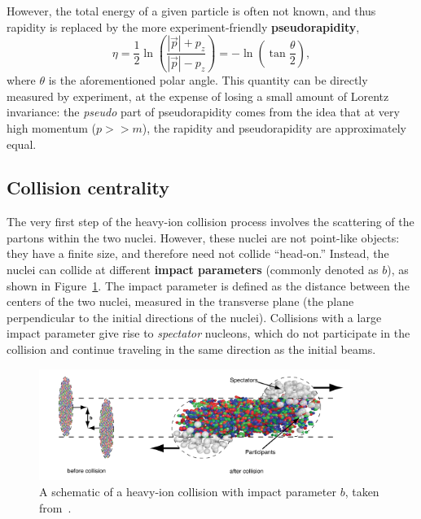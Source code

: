However, the total energy of a given particle is often not known, and thus rapidity is replaced by the more experiment-friendly \textbf{pseudorapidity}, 
\begin{equation}
    \eta = \frac{1}{2} \ln \left( \frac{|\vec{p}| + p_{z}}{|\vec{p}| - p_{z}} \right) 
        = -\ln \left( \tan \frac{\theta}{2} \right),
\end{equation}
where $\theta$ is the aforementioned polar angle. This quantity can be directly measured by experiment, at the expense of losing a small amount of Lorentz invariance: the \textit{pseudo} part of pseudorapidity comes from the idea that at very high momentum ($p >> m$), the rapidity and pseudorapidity are approximately equal.

\subsection{Collision centrality}
\label{sec:collision_centrality}

The very first step of the heavy-ion collision process involves the scattering of the partons within the two nuclei. However, these nuclei are not point-like objects: they have a finite size, and therefore need not collide ``head-on.'' Instead, the nuclei can collide at different \textbf{impact parameters} (commonly denoted as $b$), as shown in Figure~\ref{fig:impact_parameter}. The impact parameter is defined as the distance between the centers of the two nuclei, measured in the transverse plane (the plane perpendicular to the initial directions of the nuclei). Collisions with a large impact parameter give rise to \textit{spectator} nucleons, which do not participate in the collision and continue traveling in the same direction as the initial beams.

\begin{figure}[ht]
    \centering
    \includegraphics[width=0.9\textwidth]{figures/introduction/impact_parameter.png}
    \caption{A schematic of a heavy-ion collision with impact parameter $b$, taken from~\cite{CERNCourierImpactParam}.}
    \label{fig:impact_parameter}
\end{figure}

